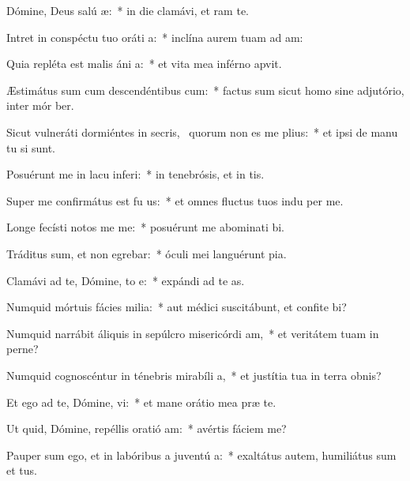 \item Dómine, Deus salú æ:~* in die clamávi, et  ram te.
\item Intret in conspéctu tuo oráti a:~* inclína aurem tuam ad  am:
\item Quia repléta est malis áni a:~* et vita mea inférno apvit.
\item Æstimátus sum cum descendéntibus  cum:~* factus sum sicut homo sine adjutório, inter mór ber.
\item Sicut vulneráti dormiéntes in secris,~\pscross{} quorum non es me plius:~* et ipsi de manu tu si sunt.
\item Posuérunt me in lacu inferi:~* in tenebrósis, et in  tis.
\item Super me confirmátus est fu us:~* et omnes fluctus tuos indu per me.
\item Longe fecísti notos me  me:~* posuérunt me abominati bi.
\item Tráditus sum, et non egrebar:~* óculi mei languérunt  pia.
\item Clamávi ad te, Dómine, to e:~* expándi ad te  as.
\item Numquid mórtuis fácies milia:~* aut médici suscitábunt, et confite bi?
\item Numquid narrábit áliquis in sepúlcro misericórdi am,~* et veritátem tuam in perne?
\item Numquid cognoscéntur in ténebris mirabíli a,~* et justítia tua in terra obnis?
\item Et ego ad te, Dómine, vi:~* et mane orátio mea præ te.
\item Ut quid, Dómine, repéllis oratió am:~* avértis fáciem   me?
\item Pauper sum ego, et in labóribus a juventú a:~* exaltátus autem, humiliátus sum et tus.
